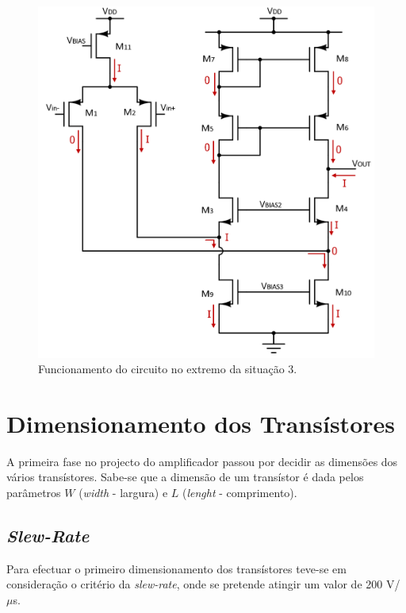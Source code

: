 \documentclass[11pt]{article}
\numberwithin{equation}{section}
\begin{document}
\begin{figure}[H]
	\centering
	\includegraphics[keepaspectratio=true, scale=0.47]{teoricas/situacao3}
	\vspace{-0.5em}
	\caption{Funcionamento do circuito no extremo da situação 3.}
	\vspace{-0.8em}
\end{figure} 

\section{Dimensionamento dos Transístores}

A primeira fase no projecto do amplificador passou por decidir as dimensões dos vários transístores. Sabe-se que a dimensão de um transístor é dada pelos parâmetros $W$ (\textit{width} - largura) e $L$ (\textit{lenght} - comprimento). 

\subsection{\textit{Slew-Rate}}

Para efectuar o primeiro dimensionamento dos transístores teve-se em consideração o critério da \textit{slew-rate}, onde se pretende atingir um valor de 200 V/$\mu$s.
\end{document}
